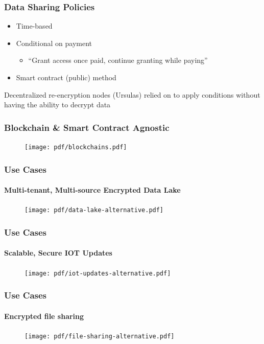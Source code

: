 \documentclass[xetex,mathsans,sans,aspectratio=169]{beamer}
\begin{document}
   \begin{frame}
        \frametitle{Data Sharing Policies}
        \begin{itemize}
            \setlength\itemsep{1em}
            \item Time-based
            \item Conditional on payment 
            \begin{itemize}
              \item ``Grant access once paid, continue granting while paying''
            \end{itemize}
            \item Smart contract (public) method
        \end{itemize}
        \bigskip
        Decentralized re-encryption nodes (Ursulas) relied on to apply conditions without having the ability to decrypt data
    \end{frame}

    \begin{frame}
        \frametitle{Blockchain \& Smart Contract Agnostic}
        \begin{figure}
            \centering
            \texttt{[image: pdf/blockchains.pdf]}
        \end{figure}
    \end{frame}

    \begin{frame}
        \frametitle{Use Cases}
        \framesubtitle{Multi-tenant, Multi-source Encrypted Data Lake}
        \begin{figure}
            \centering
            \texttt{[image: pdf/data-lake-alternative.pdf]}
        \end{figure}
    \end{frame}

    \begin{frame}
        \frametitle{Use Cases}
        \framesubtitle{Scalable, Secure IOT Updates}
        \begin{figure}
            \centering
            \texttt{[image: pdf/iot-updates-alternative.pdf]}
        \end{figure}
    \end{frame}

    \begin{frame}
        \frametitle{Use Cases}
        \framesubtitle{Encrypted file sharing}
        \begin{figure}
            \centering
            \texttt{[image: pdf/file-sharing-alternative.pdf]}
        \end{figure}
    \end{frame}
\end{document}
